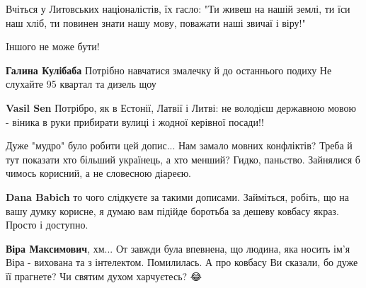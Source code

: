 \begin{itemize}
Вчіться у Литовських націоналістів, їх гасло: "Ти живеш на нашій землі, ти їси
наш хліб, ти повинен знати нашу мову, поважати наші звичаї і віру!"

Iншого не може бути!

\begin{itemize}
 
\textbf{Галина Кулібаба} Потрібно навчатися змалечку й до останнього подиху Не слухайте 95 квартал та дизель щоу

 
\textbf{Vasil Sen}
Потрібро, як в Естонії, Латвії і Литві: не володієш державною мовою - віника в руки прибирати вулиці і жодної керівної посади!!
\end{itemize}


Дуже "мудро" було робити цей допис... Нам замало мовних конфліктів? Треба й тут
показати хто більший українець, а хто менший? Гидко, паньство. Зайнялися б
чимось корисний, а не словесною діареєю.

\begin{itemize}
 
\textbf{Dana Babich} то чого слідкуєте за такими дописами. Займіться, робіть,
що на вашу думку корисне, я думаю вам підійде боротьба за дешеву ковбасу якраз.
Просто і доступно.

 
\textbf{Віра Максимович}, хм... От завжди була впевнена, що людина, яка носить
ім'я Віра - вихована та з інтелектом. Помилилась. А про ковбасу Ви сказали, бо
дуже її прагнете? Чи святим духом харчуєтесь? 😂
\end{itemize}


\end{itemize}
